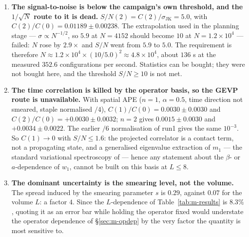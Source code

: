 \begin{warnbox}
\begin{enumerate}[label=\textbf{\arabic*.},leftmargin=2.1em]
\item \textbf{The signal-to-noise is below the campaign's own threshold, and the $1/\sqrt N$ route to
  it is dead.} $S/N(2)=C(2)/\sigma_{\mathrm{JK}}=5.0$, with
  $C(2)/C(0)=0.01189\pm0.00238$. The extrapolation used in the planning stage --- $\sigma\propto
  N^{-1/2}$, so $5.9$ at $N=4152$ should become $10$ at $N=1.2\times10^{4}$ --- failed: $N$ rose by
  $2.9\times$ and $S/N$ went from $5.9$ to $5.0$. The requirement is therefore
  $N\approx1.2\times10^{4}\times(10/5.0)^{2}\approx4.8\times10^{4}$, about $136$ s at the measured
  $352.6$ configurations per second. Statistics can be bought; they were not bought here, and the
  threshold $S/N\ge10$ is not met.
\item \textbf{The time correlation is killed by the operator basis, so the GEVP route is unavailable.}
  With spatial APE ($n=1$, $\alpha=0.5$, time direction not smeared, staple normalised $/4$),
  $C(1)/C(0)=0.0030\pm0.0030$ and $C(2)/C(0)=+0.0030\pm0.0032$; $n=2$ gives
  $0.0015\pm0.0030$ and $+0.0034\pm0.0022$. The earlier $/6$ normalisation of run1 gives the same
  $10^{-3}$. So $C(1)\to0$ with $S/N\le1.6$: the projected correlator is a contact term, not a
  propagating state, and a generalised eigenvalue extraction of $m_1$ --- the standard variational
  spectroscopy of \cite{morningstar} --- hence any statement about
  the $\beta$- or $a$-dependence of $w_1$, cannot be built on this basis at $L\le8$.
\item \textbf{The dominant uncertainty is the smearing level, not the volume.} The spread induced by
  the smearing parameter $s$ is $0.29$, against $0.07$ for the volume $L$: a factor $4$. Since the
  $L$-dependence of Table~\ref{tab:m-results} is $8.3\%$, quoting it as an error bar while holding the
  operator fixed would understate the operator dependence of \S\ref{sec:m-opdep} by the very factor
  the quantity is most sensitive to.
\end{enumerate}
\end{warnbox}

